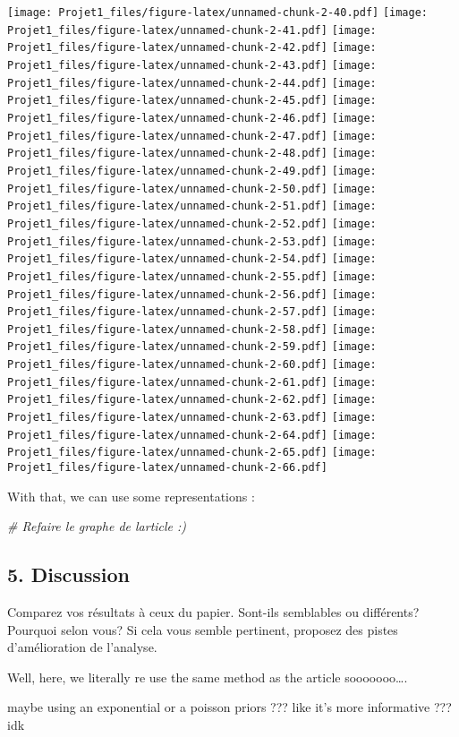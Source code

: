 \documentclass[
]{article}
\newenvironment{Shaded}{\begin{snugshade}}{\end{snugshade}}
\newcommand{\CommentTok}[1]{\textcolor[rgb]{0.56,0.35,0.01}{\textit{#1}}}
\begin{document}
\texttt{[image: Projet1\_files/figure-latex/unnamed-chunk-2-40.pdf]}
\texttt{[image: Projet1\_files/figure-latex/unnamed-chunk-2-41.pdf]}
\texttt{[image: Projet1\_files/figure-latex/unnamed-chunk-2-42.pdf]}
\texttt{[image: Projet1\_files/figure-latex/unnamed-chunk-2-43.pdf]}
\texttt{[image: Projet1\_files/figure-latex/unnamed-chunk-2-44.pdf]}
\texttt{[image: Projet1\_files/figure-latex/unnamed-chunk-2-45.pdf]}
\texttt{[image: Projet1\_files/figure-latex/unnamed-chunk-2-46.pdf]}
\texttt{[image: Projet1\_files/figure-latex/unnamed-chunk-2-47.pdf]}
\texttt{[image: Projet1\_files/figure-latex/unnamed-chunk-2-48.pdf]}
\texttt{[image: Projet1\_files/figure-latex/unnamed-chunk-2-49.pdf]}
\texttt{[image: Projet1\_files/figure-latex/unnamed-chunk-2-50.pdf]}
\texttt{[image: Projet1\_files/figure-latex/unnamed-chunk-2-51.pdf]}
\texttt{[image: Projet1\_files/figure-latex/unnamed-chunk-2-52.pdf]}
\texttt{[image: Projet1\_files/figure-latex/unnamed-chunk-2-53.pdf]}
\texttt{[image: Projet1\_files/figure-latex/unnamed-chunk-2-54.pdf]}
\texttt{[image: Projet1\_files/figure-latex/unnamed-chunk-2-55.pdf]}
\texttt{[image: Projet1\_files/figure-latex/unnamed-chunk-2-56.pdf]}
\texttt{[image: Projet1\_files/figure-latex/unnamed-chunk-2-57.pdf]}
\texttt{[image: Projet1\_files/figure-latex/unnamed-chunk-2-58.pdf]}
\texttt{[image: Projet1\_files/figure-latex/unnamed-chunk-2-59.pdf]}
\texttt{[image: Projet1\_files/figure-latex/unnamed-chunk-2-60.pdf]}
\texttt{[image: Projet1\_files/figure-latex/unnamed-chunk-2-61.pdf]}
\texttt{[image: Projet1\_files/figure-latex/unnamed-chunk-2-62.pdf]}
\texttt{[image: Projet1\_files/figure-latex/unnamed-chunk-2-63.pdf]}
\texttt{[image: Projet1\_files/figure-latex/unnamed-chunk-2-64.pdf]}
\texttt{[image: Projet1\_files/figure-latex/unnamed-chunk-2-65.pdf]}
\texttt{[image: Projet1\_files/figure-latex/unnamed-chunk-2-66.pdf]}

With that, we can use some representations :

\begin{Shaded}
\begin{Highlighting}[]
\CommentTok{\# Refaire le graphe de l\textquotesingle{}article :)}
\end{Highlighting}
\end{Shaded}

\subsection{5. Discussion}\label{discussion}

Comparez vos résultats à ceux du papier. Sont-ils semblables ou
différents? Pourquoi selon vous? Si cela vous semble pertinent, proposez
des pistes d'amélioration de l'analyse.

Well, here, we literally re use the same method as the article
sooooooo\ldots.

maybe using an exponential or a poisson priors ??? like it's more
informative ??? idk
\end{document}
